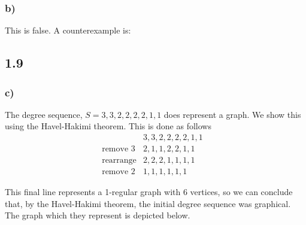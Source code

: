 \documentclass[a4paper]{article}
\begin{document}
\subsubsection*{b)} 
This is false. A counterexample is:


\subsection*{1.9}

\subsubsection*{c)}

The degree sequence, $S=3,3,2,2,2,2,1,1$ does represent a graph. We show this using the Havel-Hakimi theorem. This is done as follows
\begin{eqnarray*}
    &3,3,2,2,2,2,1,1&\\
    \text{remove 3} &2,1,1,2,2,1,1& \\ 
    \text{rearrange} &2,2,2,1,1,1,1& \\ 
    \text{remove 2} &1,1,1,1,1,1&
\end{eqnarray*}

This final line represents a 1-regular graph with 6 vertices, so we can conclude that, by the Havel-Hakimi theorem, the initial degree sequence was graphical. The graph which they represent is depicted below.

\end{document}
